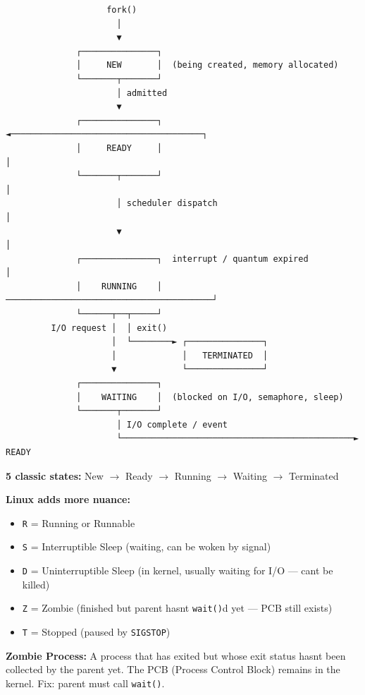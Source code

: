 \documentclass[11pt]{article}
\providecommand{\tightlist}{\setlength{\itemsep}{1pt}\setlength{\parskip}{0pt}}
\begin{document}
\setcodelang{}

\begin{verbatim}
                    fork()
                      │
                      ▼
              ┌───────────────┐
              │     NEW       │  (being created, memory allocated)
              └───────┬───────┘
                      │ admitted
                      ▼
              ┌───────────────┐  ◄──────────────────────────────────────┐
              │     READY     │                                          │
              └───────┬───────┘                                          │
                      │ scheduler dispatch                               │
                      ▼                                                  │
              ┌───────────────┐  interrupt / quantum expired             │
              │    RUNNING    │ ─────────────────────────────────────────┘
              └──────┬──┬─────┘
         I/O request │  │ exit()
                     │  └────────► ┌───────────────┐
                     │             │   TERMINATED  │
                     ▼             └───────────────┘
              ┌───────────────┐
              │    WAITING    │  (blocked on I/O, semaphore, sleep)
              └───────┬───────┘
                      │ I/O complete / event
                      └──────────────────────────────────────────────►  READY
\end{verbatim}

\textbf{5 classic states:} New \(\rightarrow\) Ready \(\rightarrow\) Running \(\rightarrow\) Waiting \(\rightarrow\) Terminated

\textbf{Linux adds more nuance:}

\begin{itemize}
\tightlist
\item
  \texttt{R} = Running or Runnable
\item
  \texttt{S} = Interruptible Sleep (waiting, can be woken by signal)
\item
  \texttt{D} = Uninterruptible Sleep (in kernel, usually waiting for I/O --- can\textquotesingle t be killed)
\item
  \texttt{Z} = Zombie (finished but parent hasn\textquotesingle t \texttt{wait()}d yet --- PCB still exists)
\item
  \texttt{T} = Stopped (paused by \texttt{SIGSTOP})
\end{itemize}

\textbf{Zombie Process:} A process that has exited but whose exit status hasn\textquotesingle t been collected by the parent yet. The PCB (Process Control Block) remains in the kernel. Fix: parent must call \texttt{wait()}.
\end{document}
